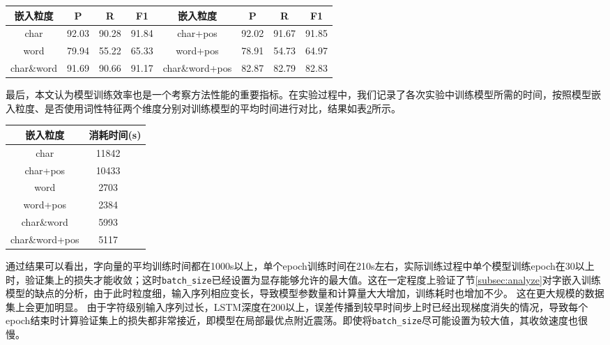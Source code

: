 \begin{table}[H]
    \centering
    \begin{tabular}{cccccccc}
        \toprule
        嵌入粒度 & P  & R  & F1 & 嵌入粒度 & P & R & F1\\
        \midrule
        char & 92.03 & 90.28 & 91.84 & char+pos & 92.02 &  91.67 & 91.85\\
        word & 79.94 & 55.22 & 65.33 & word+pos & 78.91 & 54.73 & 64.97\\
        char\&word & 91.69 & 90.66 & 91.17 & char\&word+pos & 82.87 & 82.79 & 82.83\\
        \bottomrule
    \end{tabular}
    \label{tab:overall_comparison}
\end{table}


最后，本文认为模型训练效率也是一个考察方法性能的重要指标。在实验过程中，我们记录了各次实验中训练模型所需的时间，按照模型嵌入粒度、是否使用词性特征两个维度分别对训练模型的平均时间进行对比，结果如表\ref{tab:train_time}所示。

\begin{table}[H]
    \centering
    \begin{tabular}{ccc}
        \toprule
        嵌入粒度 & \multicolumn{2}{c}{消耗时间(s)}\\
        \midrule
        char  & 11842\\
        char+pos & 10433\\
        word  & 2703 \\
        word+pos  & 2384\\
        char\&word  & 5993\\
        char\&word+pos  & 5117 \\
        \bottomrule
    \end{tabular}
    \label{tab:train_time}
\end{table}

通过结果可以看出，字向量的平均训练时间都在1000s以上，单个epoch训练时间在210s左右，实际训练过程中单个模型训练epoch在30以上时，验证集上的损失才能收敛；这时\verb|batch_size|已经设置为显存能够允许的最大值。这在一定程度上验证了节\ref{subsec:analyze}对字嵌入训练模型的缺点的分析，由于此时粒度细，输入序列相应变长，导致模型参数量和计算量大大增加，训练耗时也增加不少。
这在更大规模的数据集上会更加明显。
由于字符级别输入序列过长，LSTM深度在200以上，误差传播到较早时间步上时已经出现梯度消失的情况，导致每个epoch结束时计算验证集上的损失都非常接近，即模型在局部最优点附近震荡。即使将\verb|batch_size|尽可能设置为较大值，其收敛速度也很慢。

